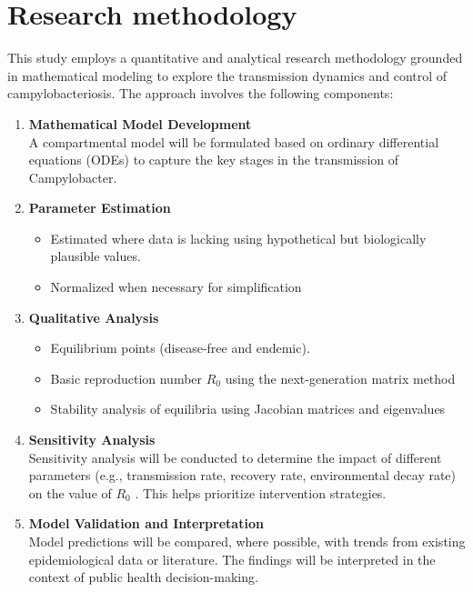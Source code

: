 \documentclass[a4paper,12pt]{report}
\begin{document}
 \section{ Research methodology}
 This study employs a quantitative and analytical research methodology grounded in mathematical modeling to explore the transmission dynamics and control of campylobacteriosis. The approach involves the following components:
 \begin{enumerate}

     \item \textbf{ Mathematical Model Development}\\
     A compartmental model will be formulated based on ordinary differential equations (ODEs) to capture the key stages in the transmission of Campylobacter. 
     \item \textbf{ Parameter Estimation} \\
     \begin{itemize}    
     \item  Estimated where data is lacking using hypothetical but biologically plausible values.
     \item  Normalized when necessary for simplification
     \end{itemize}
     \item \textbf{ Qualitative Analysis}
      \begin{itemize}
      \item Equilibrium points (disease-free and endemic).
      \item Basic reproduction number $R_0$
 using the next-generation matrix method
      
     \item Stability analysis of equilibria using Jacobian matrices and eigenvalues
     \end{itemize}
     \item  \textbf{Sensitivity Analysis}\\
     Sensitivity analysis will be conducted to determine the impact of different parameters (e.g., transmission rate, recovery rate, environmental decay rate) on the value of $R_0$ . This helps prioritize intervention strategies.
     \item \textbf{Model Validation and Interpretation} \\
     Model predictions will be compared, where possible, with trends from existing epidemiological data or literature. The findings will be interpreted in the context of public health decision-making.
 \end{enumerate}
\end{document}
